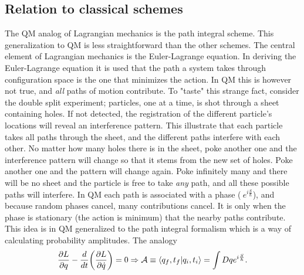 \subsection*{Relation to classical schemes}
The QM analog of Lagrangian mechanics is the path integral scheme. This generalization to QM is less straightforward than the other schemes. The central element of Lagrangian mechanics is the Euler-Lagrange equation. In deriving the Euler-Lagrange equation it is used that the path a system takes through configuration space is the one that minimizes the action. In QM this is however not true, and \emph{all} paths of motion contribute. To "taste" this strange fact, consider the double split experiment; particles, one at a time, is shot through a sheet containing holes. If not detected, the registration of the different particle's locations will reveal an interference pattern. This illustrate that each particle takes all paths through the sheet, and the different paths interfere with each other. No matter how many holes there is in the sheet, poke another one and the interference pattern will change so that it stems from the new set of holes. Poke another one and the pattern will change again. Poke infinitely many and there will be no sheet and the particle is free to take \emph{any} path, and all these possible paths will interfere. In QM each path is associated with a phase ($~e^{i\frac{S}{\hbar}}$), and because random phases cancel, many contributions cancel. It is only when the phase is stationary (the action is minimum) that the nearby paths contribute. This idea is in QM generalized to the path integral formalism which is a way of calculating probability amplitudes. The analogy
\begin{equation}
	\frac{\partial L}{\partial q}-\frac{d}{dt}\bigg(\frac{\partial L}{\partial \dot{q}}\bigg)=0 \Rightarrow \mathcal{A}\equiv\braket{q_f,t_f|q_i,t_i}=\int Dqe^{i\frac{S}{\hbar}}.
\end{equation} 

